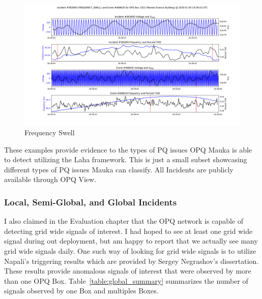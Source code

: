 \begin{figure}[H]
    \centering
    \includegraphics[width=\linewidth]{figures/incident-582690.png}
    \caption{Frequency Swell}
    \label{fig:fswell}
\end{figure}

These examples provide evidence to the types of PQ issues OPQ Mauka is able to detect utilizing the Laha framework. This is just a small subset showcasing different types of PQ issues Mauka can classify. All Incidents are publicly available through OPQ View.

\subsubsection{Local, Semi-Global, and Global Incidents}

I also claimed in the Evaluation chapter that the OPQ network is capable of detecting grid wide signals of interest. I had hoped to see at least one grid wide signal during out deployment, but am happy to report that we actually see many grid wide signals daily. One such way of looking for grid wide signals is to utilize Napali's triggering results which are provided by Sergey Negrashov's dissertation. These results provide anomalous signals of interest that were observed by more than one OPQ Box. Table~\ref{table:global_summary} summarizes the number of signals observed by one Box and multiples Boxes.

